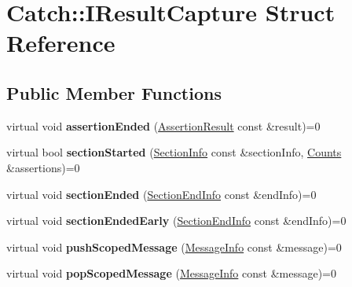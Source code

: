 \hypertarget{structCatch_1_1IResultCapture}{}\section{Catch\+:\+:I\+Result\+Capture Struct Reference}
\label{structCatch_1_1IResultCapture}
\subsection*{Public Member Functions}
\begin{DoxyCompactItemize}
\item 
\mbox{\label{structCatch_1_1IResultCapture_ae45e08bccc5fb434656d4f2e44742223}} 
virtual void {\bfseries assertion\+Ended} (\hyperlink{classCatch_1_1AssertionResult}{Assertion\+Result} const \&result)=0
\item 
\mbox{\label{structCatch_1_1IResultCapture_a5b76ed52badcb64cf374202e12b81a03}} 
virtual bool {\bfseries section\+Started} (\hyperlink{structCatch_1_1SectionInfo}{Section\+Info} const \&section\+Info, \hyperlink{structCatch_1_1Counts}{Counts} \&assertions)=0
\item 
\mbox{\label{structCatch_1_1IResultCapture_a4e152bc43dc0933684e31fa67a58195d}} 
virtual void {\bfseries section\+Ended} (\hyperlink{structCatch_1_1SectionEndInfo}{Section\+End\+Info} const \&end\+Info)=0
\item 
\mbox{\label{structCatch_1_1IResultCapture_afcc71eef8ca821ae132cced4a2be6988}} 
virtual void {\bfseries section\+Ended\+Early} (\hyperlink{structCatch_1_1SectionEndInfo}{Section\+End\+Info} const \&end\+Info)=0
\item 
\mbox{\label{structCatch_1_1IResultCapture_a91d154c1e087e383dcde5aad95cb6a05}} 
virtual void {\bfseries push\+Scoped\+Message} (\hyperlink{structCatch_1_1MessageInfo}{Message\+Info} const \&message)=0
\item 
\mbox{\label{structCatch_1_1IResultCapture_a42bcb13276706bf8c3ce081ce16d37fd}} 
virtual void {\bfseries pop\+Scoped\+Message} (\hyperlink{structCatch_1_1MessageInfo}{Message\+Info} const \&message)=0

\end{DoxyCompactItemize}
